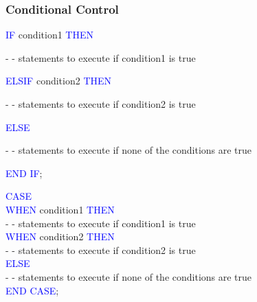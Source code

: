 \subsubsection{Conditional Control}
\begin{tcolorbox}[title = If] 

    \textcolor{blue}{IF} condition1 \textcolor{blue}{THEN}

    \textcolor{commentgray}{- - statements to execute if condition1 is true}

    \textcolor{blue}{ELSIF} condition2 \textcolor{blue}{THEN}

    \textcolor{commentgray}{- - statements to execute if condition2 is true}

    \textcolor{blue}{ELSE}

    \textcolor{commentgray}{- - statements to execute if none of the conditions are true}

   \textcolor{blue}{END IF};
\end{tcolorbox}
\begin{tcolorbox}[title = Switch Case]
    
\textcolor{blue}{CASE} \\
\textcolor{blue}{WHEN} condition1 \textcolor{blue}{THEN}\\
\textcolor{commentgray}{- - statements to execute if condition1 is true}\\
\textcolor{blue}{WHEN} condition2 \textcolor{blue}{THEN}\\
\textcolor{commentgray}{- - statements to execute if condition2 is true}\\
        \textcolor{blue}{ELSE}\\
        \textcolor{commentgray}{- - statements to execute if none of the conditions are true}\\
\textcolor{blue}{END CASE};

\end{tcolorbox}
